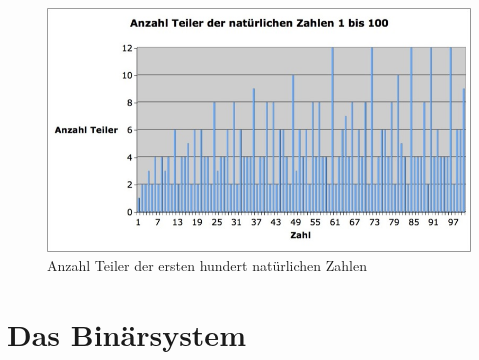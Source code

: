 \documentclass[%
11pt,%
twoside,%
titlepage,%
german,%
]{scrartcl}
\begin{document}
\begin{landscape}
\begin{figure}[h]
\begin{center}
\includegraphics[height=0.7\textheight]{pictures/anzahlteiler}
\end{center}
\caption{Anzahl Teiler der ersten hundert nat\"urlichen Zahlen}
\end{figure}
\end{landscape}

\clearpage

\appendix

\section{Das Bin\"arsystem}
\end{document}
